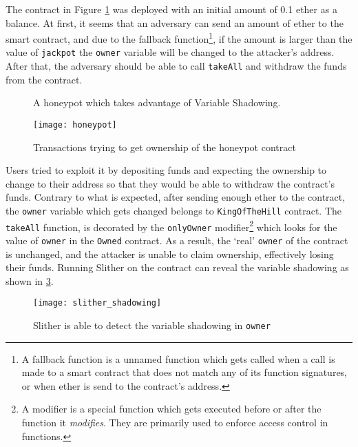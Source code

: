 The contract in Figure \ref{fig:owner_honeypot} was deployed with an initial amount of 0.1 ether as a balance. At first, it seems that an adversary can send an amount of ether to the smart contract, and due to the fallback function\footnote{A fallback function is a unnamed function which gets called when a call is made to a smart contract that does not match any of its function signatures, or when ether is send to the contract's address.}, if the amount is larger than the value of \texttt{jackpot} the \texttt{owner} variable will be changed to the attacker's address. After that, the adversary should be able to call \texttt{takeAll} and withdraw the funds from the contract.

\begin{figure}[ht!]
    \centering
    
    \caption{A honeypot which takes advantage of Variable Shadowing.}
    \label{fig:owner_honeypot}
\end{figure}

\begin{figure}[ht!]
    \centering
    \texttt{[image: honeypot]}
    \caption{Transactions trying to get ownership of the honeypot contract}
    \label{fig:honeypot_tx}
\end{figure}

Users tried to exploit it by depositing funds and expecting the ownership to change to their address so that they would be able to withdraw the contract's funds. Contrary to what is expected, after sending enough ether to the contract, the \texttt{owner} variable which gets changed belongs to \texttt{KingOfTheHill} contract. The \texttt{takeAll} function, is decorated by the \texttt{onlyOwner} modifier\footnote{A modifier is a special function which gets executed before or after the function it \textit{modifies}. They are primarily used to enforce access control in functions.} which looks for the value of \texttt{owner} in the \texttt{Owned} contract. As a result, the `real' \texttt{owner} of the contract is unchanged, and the attacker is unable to claim ownership, effectively losing their funds. Running Slither on the contract can reveal the variable shadowing as shown in \ref{fig:slither_shadowing}.

\begin{figure}[H]
    \centering
    \texttt{[image: slither\_shadowing]}
    \caption{Slither is able to detect the variable shadowing in \texttt{owner}}
    \label{fig:slither_shadowing}
\end{figure}


